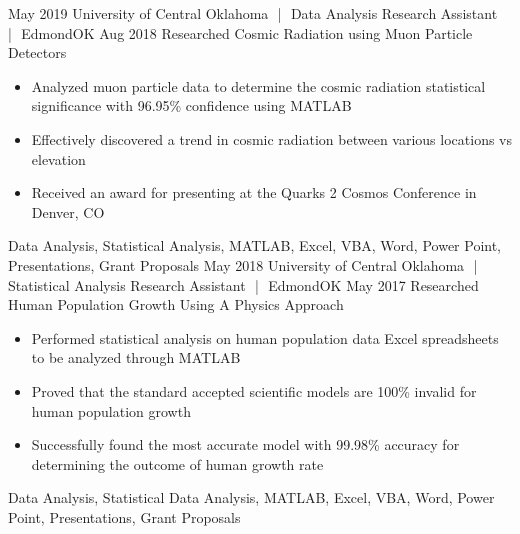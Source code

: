 \begin{experiences}
  \consultantexperience
    {May 2019}       {University of Central Oklahoma\,\, |\,\, Data Analysis Research Assistant\,\, |\,\, Edmond}{OK}{}
    {Aug 2018}    {Researched Cosmic Radiation using Muon Particle Detectors}{} 
     {
       \begin{itemize}\small
             \item Analyzed muon particle data to determine the cosmic radiation statistical significance with 96.95\% confidence using MATLAB
             \item Effectively discovered a trend in cosmic radiation between various locations vs elevation
             \item Received an award for presenting at the Quarks 2 Cosmos Conference in Denver, CO
       \end{itemize}
     }
                    {Data Analysis, Statistical Analysis, MATLAB, Excel, VBA, Word, Power Point, Presentations, Grant Proposals}
  \emptySeparator
  \consultantexperience
  {May 2018}      {University of Central Oklahoma\,\, |\,\, Statistical Analysis Research Assistant\,\, |\,\, Edmond}{OK}{}
  {May 2017}      {Researched Human Population Growth Using A Physics Approach}{}
       { 
         \begin{itemize}\small
           \item Performed statistical analysis on human population data Excel spreadsheets to be analyzed through MATLAB
           \item Proved that the standard accepted scientific models are 100\% invalid for human population growth
           \item Successfully found the most accurate model with 99.98\% accuracy for determining the outcome of human growth rate 
         \end{itemize}
       }
       {Data Analysis, Statistical Data Analysis, MATLAB, Excel, VBA, Word, Power Point, Presentations, Grant Proposals}
\end{experiences}
